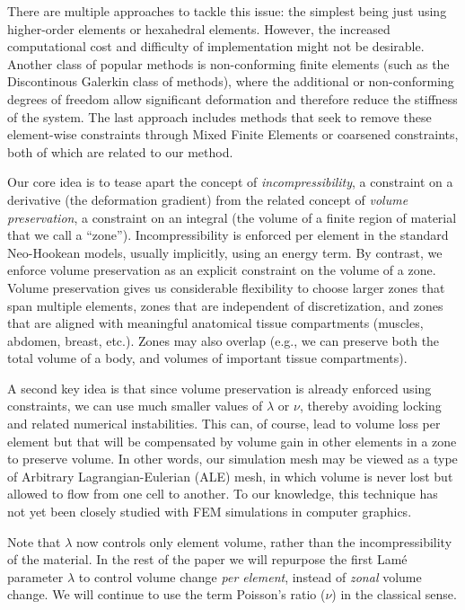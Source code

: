 There are multiple approaches to tackle this issue: the simplest being
just using higher-order elements or hexahedral elements. However, the
increased computational cost and difficulty of implementation might
not be desirable. Another class of popular methods is non-conforming
finite elements (such as the Discontinous Galerkin class of methods),
where the additional or non-conforming degrees of freedom allow
significant deformation and therefore reduce the stiffness of the
system.  The last approach includes methods that seek to remove these
element-wise constraints through Mixed Finite Elements or coarsened
constraints, both of which are related to our method.

Our core idea is to tease apart the concept of {\em
	incompressibility}, a constraint on a derivative (the deformation
gradient) from the related concept of {\em volume preservation}, a
constraint on an integral (the volume of a finite region of material
that we call a ``zone''). Incompressibility is enforced per element in
the standard Neo-Hookean models, usually implicitly, using an energy
term. By contrast, we enforce volume preservation as an explicit
constraint on the volume of a zone. Volume preservation gives us
considerable flexibility to choose larger zones that span multiple
elements, zones that are independent of discretization, and zones that
are aligned with meaningful anatomical tissue compartments (muscles,
abdomen, breast, etc.). Zones may also overlap (e.g., we can preserve
both the total volume of a body, and volumes of important tissue
compartments).

A second key idea is that since volume preservation is already
enforced using constraints, we can use much smaller values of
$\lambda$ or $\nu$, thereby avoiding locking and related numerical
instabilities. This can, of course, lead to volume loss per element
but that will be compensated by volume gain in other elements in a
zone to preserve volume. In other words, our simulation mesh may be
viewed as a type of Arbitrary Lagrangian-Eulerian (ALE) mesh, in which
volume is never lost but allowed to flow from one cell to another. To
our knowledge, this technique has not yet been closely studied with
FEM simulations in computer graphics.

Note that $\lambda$ now controls only element volume, rather than the
incompressibility of the material. In the rest of the paper we will
repurpose the first Lam\'e parameter $\lambda$ to control volume
change \emph{per element}, instead of \emph{zonal} volume change.
We will continue to use the term Poisson's ratio ($\nu$) in the
classical sense.

